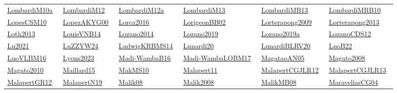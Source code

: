 \begin{longtable}{*{6}{l}}
\href{../works/LombardiM10a.pdf}{LombardiM10a}~\cite{LombardiM10a} & \href{../works/LombardiM12.pdf}{LombardiM12}~\cite{LombardiM12} & \href{../works/LombardiM12a.pdf}{LombardiM12a}~\cite{LombardiM12a} & \href{../works/LombardiM13.pdf}{LombardiM13}~\cite{LombardiM13} & \href{../works/LombardiMB13.pdf}{LombardiMB13}~\cite{LombardiMB13} & \href{../works/LombardiMRB10.pdf}{LombardiMRB10}~\cite{LombardiMRB10}\\ 
\href{../works/LopesCSM10.pdf}{LopesCSM10}~\cite{LopesCSM10} & \href{../works/LopezAKYG00.pdf}{LopezAKYG00}~\cite{LopezAKYG00} & \href{../}{Lorca2016}~\cite{Lorca2016} & \href{../works/LorigeonBB02.pdf}{LorigeonBB02}~\cite{LorigeonBB02} & \href{../}{Lorterapong2009}~\cite{Lorterapong2009} & \href{../}{Lorterapong2013}~\cite{Lorterapong2013}\\ 
\href{../}{Loth2013}~\cite{Loth2013} & \href{../works/LouieVNB14.pdf}{LouieVNB14}~\cite{LouieVNB14} & \href{../}{Lozano2014}~\cite{Lozano2014} & \href{../}{Lozano2019}~\cite{Lozano2019} & \href{../}{Lozano2019a}~\cite{Lozano2019a} & \href{../works/LozanoCDS12.pdf}{LozanoCDS12}~\cite{LozanoCDS12}\\ 
\href{../}{Lu2021}~\cite{Lu2021} & \href{../works/LuZZYW24.pdf}{LuZZYW24}~\cite{LuZZYW24} & \href{../works/LudwigKRBMS14.pdf}{LudwigKRBMS14}~\cite{LudwigKRBMS14} & \href{../works/Lunardi20.pdf}{Lunardi20}~\cite{Lunardi20} & \href{../works/LunardiBLRV20.pdf}{LunardiBLRV20}~\cite{LunardiBLRV20} & \href{../works/LuoB22.pdf}{LuoB22}~\cite{LuoB22}\\ 
\href{../works/LuoVLBM16.pdf}{LuoVLBM16}~\cite{LuoVLBM16} & \href{../}{Lyons2023}~\cite{Lyons2023} & \href{../works/Madi-WambaB16.pdf}{Madi-WambaB16}~\cite{Madi-WambaB16} & \href{../works/Madi-WambaLOBM17.pdf}{Madi-WambaLOBM17}~\cite{Madi-WambaLOBM17} & \href{../}{MagataoAN05}~\cite{MagataoAN05} & \href{../}{Magato2008}~\cite{Magato2008}\\ 
\href{../}{Magato2010}~\cite{Magato2010} & \href{../works/Maillard15.pdf}{Maillard15}~\cite{Maillard15} & \href{../works/MakMS10.pdf}{MakMS10}~\cite{MakMS10} & \href{../works/Malapert11.pdf}{Malapert11}~\cite{Malapert11} & \href{../works/MalapertCGJLR12.pdf}{MalapertCGJLR12}~\cite{MalapertCGJLR12} & \href{../works/MalapertCGJLR13.pdf}{MalapertCGJLR13}~\cite{MalapertCGJLR13}\\ 
\href{../works/MalapertGR12.pdf}{MalapertGR12}~\cite{MalapertGR12} & \href{../works/MalapertN19.pdf}{MalapertN19}~\cite{MalapertN19} & \href{../works/Malik08.pdf}{Malik08}~\cite{Malik08} & \href{../}{Malik2008}~\cite{Malik2008} & \href{../works/MalikMB08.pdf}{MalikMB08}~\cite{MalikMB08} & \href{../works/MaraveliasCG04.pdf}{MaraveliasCG04}~\cite{MaraveliasCG04}\\ 

\end{longtable}
